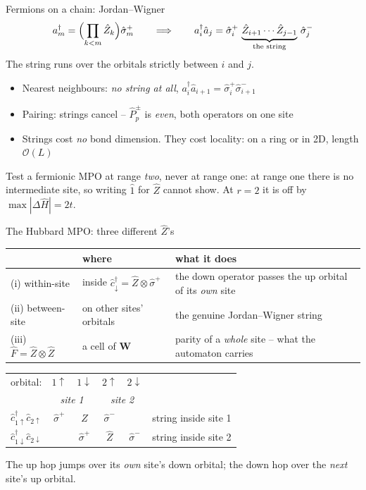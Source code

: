 \documentclass[aspectratio=169,10pt]{beamer}
\newcommand{\warnbox}[1]{%
  \begin{tcolorbox}[colback=palewarm,colframe=warm,title={\bfseries A trap to avoid}]
  #1
  \end{tcolorbox}}
\newcommand{\bigO}{\mathcal{O}}
\newcommand{\bmat}[1]{\bm{#1}}
\newcommand{\hH}{\hat{H}}
\newcommand{\ad}[1]{a_{#1}^{\dagger}}
\begin{document}
\begin{frame}{Fermions on a chain: Jordan--Wigner}
  \[
    \ad m=\Bigl(\prod_{k<m}\hat Z_k\Bigr)\hat\sigma^+_m
    \qquad\Longrightarrow\qquad
    \ad i\hat a_j=\hat\sigma^+_i\,\underbrace{\hat Z_{i+1}\cdots\hat Z_{j-1}}_{\text{the string}}\,\hat\sigma^-_j
  \]
  \centering The string runs over the orbitals \alert{strictly between} $i$ and $j$.
  \begin{itemize}
    \item Nearest neighbours: \emph{no string at all}, $\ad i\hat a_{i+1}=\hat\sigma^+_i\hat\sigma^-_{i+1}$
    \item Pairing: strings \alert{cancel} -- $\hat P^\pm_p$ is \emph{even}, both operators on one site
    \item Strings cost \emph{no} bond dimension. They cost \alert{locality}: on a ring or in 2D, length $\bigO(L)$
  \end{itemize}
  \vspace{0.3em}
  \warnbox{Test a fermionic MPO at range \emph{two}, never at range one: at range one there is no intermediate site, so writing $\hat 1$ for $\hat Z$ cannot show. At $r=2$ it is off by $\max|\Delta\hH|=2t$.}
\end{frame}

\begin{frame}{The Hubbard MPO: three different $\hat Z$'s}
  \begin{center}\small
  \begin{tabular}{@{}llp{6.0cm}@{}}\toprule
   & where & what it does\\\midrule
  (i) within-site & inside $\hat c^\dagger_\downarrow=\hat Z\otimes\hat\sigma^+$ & the down operator passes the up orbital of its \emph{own} site\\
  (ii) between-site & on other sites' orbitals & the genuine Jordan--Wigner string\\
  (iii) $\hat F=\hat Z\otimes\hat Z$ & a cell of $\bmat W$ & parity of a \emph{whole} site -- what the automaton carries\\\bottomrule
  \end{tabular}
  \end{center}
  \begin{center}\small
  \begin{tabular}{@{}l|cc|cc|l@{}}\toprule
  orbital: & $1\!\uparrow$ & $1\!\downarrow$ & $2\!\uparrow$ & $2\!\downarrow$ & \\
   & \multicolumn{2}{c|}{\emph{site 1}} & \multicolumn{2}{c|}{\emph{site 2}} & \\\midrule
  $\hat c^\dagger_{1\uparrow}\hat c_{2\uparrow}$ & $\hat\sigma^+$ & \alert{$\hat Z$} & $\hat\sigma^-$ & & string \alert{inside site 1}\\
  $\hat c^\dagger_{1\downarrow}\hat c_{2\downarrow}$ & & $\hat\sigma^+$ & \alert{$\hat Z$} & $\hat\sigma^-$ & string \alert{inside site 2}\\\bottomrule
  \end{tabular}
  \end{center}
  \centering The up hop jumps over its \emph{own} site's down orbital; the down hop over the \emph{next} site's up orbital.
\end{frame}
\end{document}
